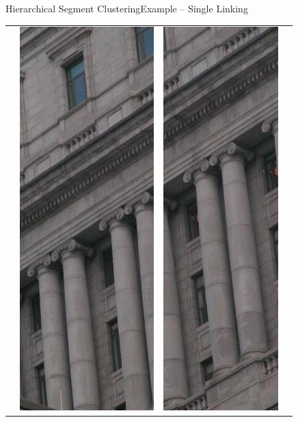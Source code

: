 \documentclass[10pt]{beamer}
\begin{document}
\begin{frame}{Hierarchical Segment Clustering}{Example -- Single Linking}
{\begin{center}
\begin{tabular}{>{\centering\arraybackslash}b{} >{\centering\arraybackslash}b{}>{\centering\arraybackslash}b{}>{\centering\arraybackslash}b{}}
		    & \includegraphics[scale=0.25]{./images/clustering/mcgill_20_segment_3.jpg}
		    & \includegraphics[scale=0.25]{./images/clustering/mcgill_20_segment_4.jpg}

\end{tabular}
\end{center}}
\end{frame}
\end{document}
